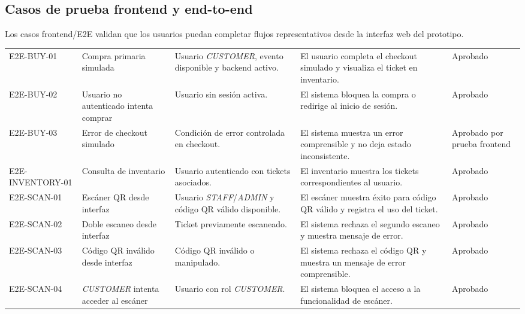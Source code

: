 \documentclass[12pt,letterpaper]{article}
\begin{document}
\subsection{Casos de prueba frontend y end-to-end}

Los casos frontend/E2E validan que los usuarios puedan completar flujos representativos desde la interfaz web del prototipo.

\begin{table}[H]
\centering
\begingroup
\scriptsize
\setlength{\tabcolsep}{2.5pt}
\renewcommand{\arraystretch}{1.18}

\begin{tabularx}{\textwidth}{|
>{\raggedright\arraybackslash}p{2.5cm}|
>{\raggedright\arraybackslash}p{3.2cm}|
>{\raggedright\arraybackslash}X|
>{\raggedright\arraybackslash}p{3.6cm}|
>{\centering\arraybackslash}p{1.5cm}|}
\hline
\multicolumn{1}{|>{\centering\arraybackslash}m{2.5cm}|}{\textbf{ID}} &
\multicolumn{1}{>{\centering\arraybackslash}m{3.2cm}|}{\textbf{Caso}} &
\multicolumn{1}{>{\centering\arraybackslash}m{3.5cm}|}{\textbf{Precondiciones}} &
\multicolumn{1}{>{\centering\arraybackslash}m{3.6cm}|}{\textbf{Resultado esperado}} &
\multicolumn{1}{>{\centering\arraybackslash}m{1.5cm}|}{\textbf{Estado}} \\
\hline
E2E-BUY-01 & Compra primaria simulada & Usuario \textit{CUSTOMER}, evento disponible y backend activo. & El usuario completa el checkout simulado y visualiza el ticket en inventario. & Aprobado \\
\hline
E2E-BUY-02 & Usuario no autenticado intenta comprar & Usuario sin sesión activa. & El sistema bloquea la compra o redirige al inicio de sesión. & Aprobado \\
\hline
E2E-BUY-03 & Error de checkout simulado & Condición de error controlada en checkout. & El sistema muestra un error comprensible y no deja estado inconsistente. & Aprobado por prueba frontend \\
\hline
E2E-INVENTORY-01 & Consulta de inventario & Usuario autenticado con tickets asociados. & El inventario muestra los tickets correspondientes al usuario. & Aprobado \\
\hline
E2E-SCAN-01 & Escáner QR desde interfaz & Usuario \textit{STAFF}/\textit{ADMIN} y código QR válido disponible. & El escáner muestra éxito para código QR válido y registra el uso del ticket. & Aprobado \\
\hline
E2E-SCAN-02 & Doble escaneo desde interfaz & Ticket previamente escaneado. & El sistema rechaza el segundo escaneo y muestra mensaje de error. & Aprobado \\
\hline
E2E-SCAN-03 & Código QR inválido desde interfaz & Código QR inválido o manipulado. & El sistema rechaza el código QR y muestra un mensaje de error comprensible. & Aprobado \\
\hline
E2E-SCAN-04 & \textit{CUSTOMER} intenta acceder al escáner & Usuario con rol \textit{CUSTOMER}. & El sistema bloquea el acceso a la funcionalidad de escáner. & Aprobado \\
\hline
\end{tabularx}


\end{table}
\end{document}
